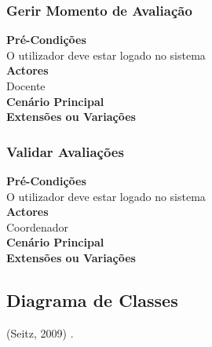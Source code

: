 \subsubsection{Gerir Momento de Avaliação}
	\textbf{Pré-Condições}\\
	O utilizador deve estar logado no sistema\\
	\textbf{Actores}\\
	Docente\\
	\textbf{Cenário Principal}\\
	\textbf{Extensões ou Variações}\\



\subsubsection{Validar Avaliações}
	\textbf{Pré-Condições}\\
	O utilizador deve estar logado no sistema\\
	\textbf{Actores}\\
	Coordenador\\
	\textbf{Cenário Principal}\\
	\textbf{Extensões ou Variações}\\

\subsection{Diagrama de Classes}
(Seitz, 2009) \cite{seitz09:_gray_hat_python}.

